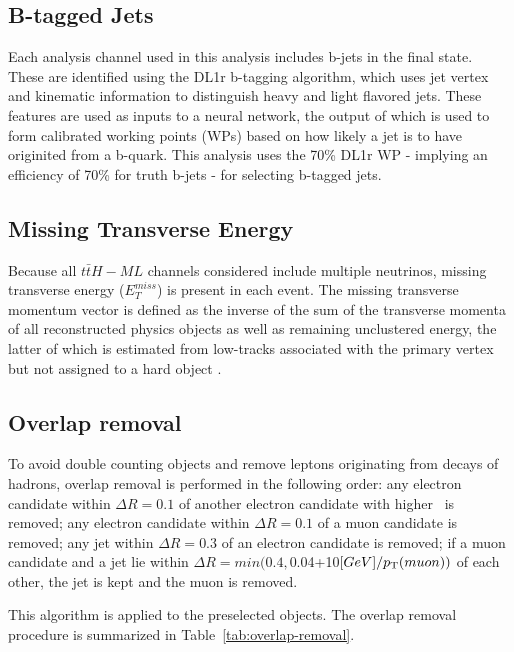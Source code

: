 \subsection{B-tagged Jets}
\label{subsec:bjetSelection}

Each analysis channel used in this analysis includes b-jets in the final state. These are identified using the DL1r b-tagging algorithm, which uses jet vertex and kinematic information to distinguish heavy and light flavored jets. These features are used as inputs to a neural network, the output of which is used to form calibrated working points (WPs) based on how likely a jet is to have originited from a b-quark. This analysis uses the 70\% DL1r WP - implying an efficiency of 70\% for truth b-jets - for selecting b-tagged jets. 

\subsection{Missing Transverse Energy}

Because all $t\bar{t}H-ML$ channels considered include multiple neutrinos, missing transverse energy ($E_T^{miss}$) is present in each event. The missing transverse momentum vector is defined as the inverse of the sum of the transverse momenta of all reconstructed physics objects as well as remaining unclustered energy, the latter of which is estimated from low-\pt tracks associated with the primary vertex but not assigned to a hard object \cite{ATL-PHYS-PUB-2015-027}.

\subsection{Overlap removal}
\label{subsec:overlapremoval}

To avoid double counting objects and remove leptons originating from decays of hadrons, overlap removal is performed in the following order: any electron candidate within $\Delta R = 0.1$ of another electron candidate with higher \pt\ is removed; any electron candidate within $\Delta R = 0.1$ of a muon candidate is removed; any jet within $\Delta R = 0.3$ of an electron candidate is removed; if a muon candidate and a jet lie within $\Delta R = min(0.4, $0.04+10$[GeV]/p_{\text{T}}(muon))$ of each other, the jet is kept and the muon is removed.

This algorithm is applied to the preselected objects. The overlap removal procedure is summarized in Table~\ref{tab:overlap-removal}.

